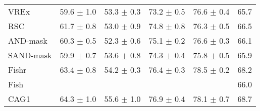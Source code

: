 \documentclass{article}
\begin{document}
\begin{center}
{\begin{tabular}{lccccc}
VREx                 & 59.6 $\pm$ 1.0       & 53.3 $\pm$ 0.3       & 73.2 $\pm$ 0.5       & 76.6 $\pm$ 0.4       & 65.7                 \\
RSC                  & 61.7 $\pm$ 0.8       & 53.0 $\pm$ 0.9       & 74.8 $\pm$ 0.8       & 76.3 $\pm$ 0.5       & 66.5                 \\
AND-mask             & 60.3 $\pm$ 0.5       & 52.3 $\pm$ 0.6       & 75.1 $\pm$ 0.2       & 76.6 $\pm$ 0.3       & 66.1                 \\
SAND-mask            & 59.9 $\pm$ 0.7       & 53.6 $\pm$ 0.8       & 74.3 $\pm$ 0.4       & 75.8 $\pm$ 0.5       & 65.9                 \\
Fishr                & 63.4 $\pm$ 0.8       & 54.2 $\pm$ 0.3       & 76.4 $\pm$ 0.3       & 78.5 $\pm$ 0.2       & 68.2                 \\
Fish                 &                      &                      &                      &                      & 66.0                \\
\midrule
CAG1                 & 64.3 $\pm$ 1.0       & 55.6 $\pm$ 1.0       & 76.9 $\pm$ 0.4       & 78.1 $\pm$ 0.7       & 68.7                 \\

\bottomrule
\end{tabular}}
\end{center}
\end{document}
